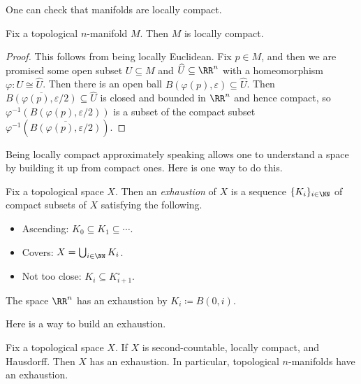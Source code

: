 \documentclass[../notes.tex]{subfiles}
\begin{document}
One can check that manifolds are locally compact.
\begin{proposition} \label{prop:man-is-loc-cmpt}
	Fix a topological $n$-manifold $M$. Then $M$ is locally compact.
\end{proposition}
\begin{proof}
	This follows from being locally Euclidean. Fix $p\in M$, and then we are promised some open subset $U\subseteq M$ and $\widehat U\subseteq\RR^n$ with a homeomorphism $\varphi\colon U\cong\widehat U$. Then there is an open ball $B(\varphi(p),\varepsilon)\subseteq\widehat U$. Then $\overline{B(\varphi(p),\varepsilon/2)}\subseteq\widehat U$ is closed and bounded in $\RR^n$ and hence compact, so $\varphi^{-1}(B(\varphi(p),\varepsilon/2))$ is a subset of the compact subset $\varphi^{-1}(\overline{B(\varphi(p),\varepsilon/2)})$.
\end{proof}
Being locally compact approximately speaking allows one to understand a space by building it up from compact ones. Here is one way to do this.
\begin{definition}[exhaustion]
	Fix a topological space $X$. Then an \textit{exhaustion} of $X$ is a sequence $\{K_i\}_{i\in\NN}$ of compact subsets of $X$ satisfying the following.
	\begin{itemize}
		\item Ascending: $K_0\subseteq K_1\subseteq\cdots$.
		\item Covers: $X=\bigcup_{i\in\NN}K_i$.
		\item Not too close: $K_i\subseteq K_{i+1}^\circ$.
	\end{itemize}
\end{definition}
\begin{example}
	The space $\RR^n$ has an exhaustion by $K_i\coloneqq B(0,i)$.
\end{example}
Here is a way to build an exhaustion.
\begin{proposition} \label{prop:get-exhaustion}
	Fix a topological space $X$. If $X$ is second-countable, locally compact, and Hausdorff. Then $X$ has an exhaustion. In particular, topological $n$-manifolds have an exhaustion.
\end{proposition}
\end{document}
